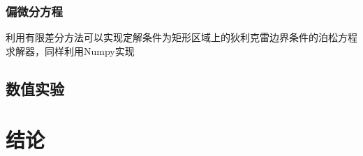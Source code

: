\documentclass[UTF8,a4paper,10pt]{ctexart}
\begin{document}
\begin{multicols}{2}
            \subsubsection{偏微分方程}
            利用有限差分方法可以实现定解条件为矩形区域上的狄利克雷边界条件的泊松方程求解器，同样利用Numpy实现
            
        \subsection{数值实验}
    \section{结论}
\end{multicols}
\end{document}
